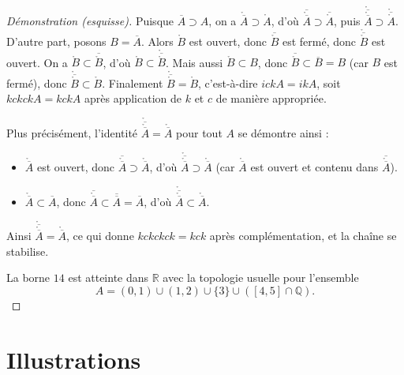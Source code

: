 \documentclass[12pt,a4paper,openany]{book}
\theoremstyle{definition}
\theoremstyle{cours}
\theoremstyle{coursnormal}
\newcommand{\Q}{\mathbb{Q}}
\newcommand{\R}{\mathbb{R}}
\newcommand{\Int}[1]{\mathring{#1}}
\newcommand{\Cl}[1]{\overline{#1}}
\begin{document}
\begin{proof}[Démonstration (esquisse)]
  Puisque $\Cl{A} \supset A$, on a $\Int{\Cl{A}} \supset \Int{A}$, d'où $\Cl{\Int{\Cl{A}}} \supset \Cl{\Int{A}}$, puis $\Int{\Cl{\Int{\Cl{A}}}} \supset \Int{\Cl{\Int{A}}}$. D'autre part, posons $B = \Cl{A}$. Alors $\Int{B}$ est ouvert, donc $\Cl{\Int{B}}$ est fermé, donc $\Int{\Cl{\Int{B}}}$ est ouvert. On a $\Int{B} \subset \Cl{\Int{B}}$, d'où $\Int{B} \subset \Int{\Cl{\Int{B}}}$. Mais aussi $\Int{B} \subset B$, donc $\Cl{\Int{B}} \subset \Cl{B} = B$ (car $B$ est fermé), donc $\Int{\Cl{\Int{B}}} \subset \Int{B}$. Finalement $\Int{\Cl{\Int{B}}} = \Int{B}$, c'est-à-dire $ickA = ikA$, soit $kckckA = kckA$ après application de $k$ et $c$ de manière appropriée.

  Plus précisément, l'identité $\Int{\Cl{\Int{\Cl{A}}}} = \Int{\Cl{A}}$ pour tout $A$ se démontre ainsi :
  \begin{itemize}
    \item $\Int{\Cl{A}}$ est ouvert, donc $\Cl{\Int{\Cl{A}}} \supset \Int{\Cl{A}}$, d'où $\Int{\Cl{\Int{\Cl{A}}}} \supset \Int{\Cl{A}}$ (car $\Int{\Cl{A}}$ est ouvert et contenu dans $\Cl{\Int{\Cl{A}}}$).
    \item $\Int{\Cl{A}} \subset \Cl{A}$, donc $\Cl{\Int{\Cl{A}}} \subset \Cl{\Cl{A}} = \Cl{A}$, d'où $\Int{\Cl{\Int{\Cl{A}}}} \subset \Int{\Cl{A}}$.
  \end{itemize}
  Ainsi $\Int{\Cl{\Int{\Cl{A}}}} = \Int{\Cl{A}}$, ce qui donne $kckckck = kck$ après complémentation, et la chaîne se stabilise.

  La borne $14$ est atteinte dans $\R$ avec la topologie usuelle pour l'ensemble
  \[
    A = (0,1) \cup (1,2) \cup \{3\} \cup ([4,5] \cap \Q).
  \]
\end{proof}

\section{Illustrations}
\label{sec:illustrations-chap2}
\end{document}
